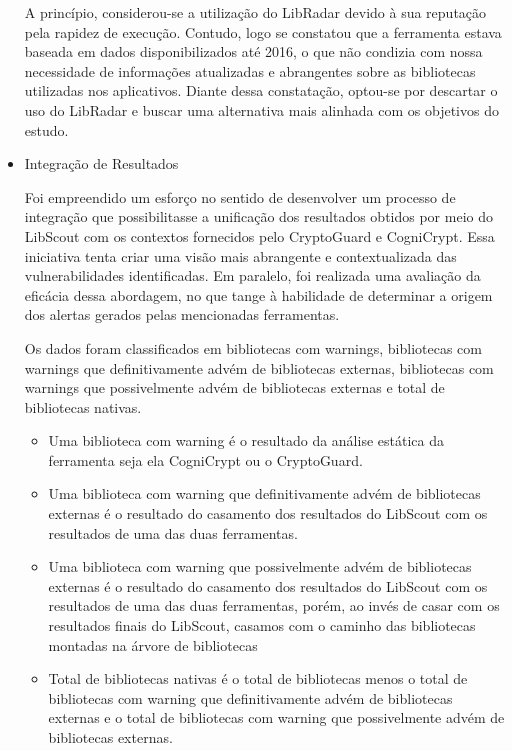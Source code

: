 \begin{itemize}
A princípio, considerou-se a utilização do LibRadar devido à sua reputação pela rapidez de execução. Contudo, logo se constatou que a ferramenta estava baseada em dados disponibilizados até 2016, o que não condizia com nossa necessidade de informações atualizadas e abrangentes sobre as bibliotecas utilizadas nos aplicativos. Diante dessa constatação, optou-se por descartar o uso do LibRadar e buscar uma alternativa mais alinhada com os objetivos do estudo.


\item{Integração de Resultados}

Foi empreendido um esforço no sentido de desenvolver um processo de integração que possibilitasse a unificação dos resultados obtidos por meio do LibScout com os contextos fornecidos pelo CryptoGuard e CogniCrypt. Essa iniciativa tenta criar uma visão mais abrangente e contextualizada das vulnerabilidades identificadas. Em paralelo, foi realizada uma avaliação da eficácia dessa abordagem, no que tange à habilidade de determinar a origem dos alertas gerados pelas mencionadas ferramentas.

Os dados foram classificados em bibliotecas com warnings, bibliotecas com warnings que definitivamente advém de bibliotecas externas, bibliotecas com warnings que possivelmente advém de bibliotecas externas e total de bibliotecas nativas.

  \begin{itemize}
    \item{Uma biblioteca com warning é o resultado da análise estática da ferramenta seja ela CogniCrypt ou o CryptoGuard.}

    \item{Uma biblioteca com warning que definitivamente advém de bibliotecas externas é o resultado do casamento dos resultados do LibScout com os resultados de uma das duas ferramentas.}

    \item{Uma biblioteca com warning que possivelmente advém de bibliotecas externas é o resultado do casamento dos resultados do LibScout com os resultados de uma das duas ferramentas, porém, ao invés de casar com os resultados finais do LibScout, casamos com o caminho das bibliotecas montadas na árvore de bibliotecas}

    \item{Total de bibliotecas nativas é o total de bibliotecas menos o total de bibliotecas com warning que definitivamente advém de bibliotecas externas e o total de bibliotecas com warning que possivelmente advém de bibliotecas externas.}
  \end{itemize}
\end{itemize}
